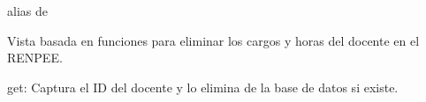 \documentclass[letterpaper,10pt,spanish]{sphinxmanual}
\begin{document}
\begin{fulllineitems}
\begin{fulllineitems}
\end{fulllineitems}



\begin{fulllineitems}

\pysigstartsignatures
{}
\pysigstopsignatures
\sphinxAtStartPar
alias de 

\end{fulllineitems}



\begin{fulllineitems}

\pysigstartsignatures
{}
\pysigstopsignatures
\end{fulllineitems}



\begin{fulllineitems}

\pysigstartsignatures
{}
\pysigstopsignatures
\end{fulllineitems}


\end{fulllineitems}



\begin{fulllineitems}

\pysigstartsignatures
{}
\pysigstopsignatures
\sphinxAtStartPar
Vista basada en funciones para eliminar los cargos y horas del docente en el RENPEE.
\begin{description}
\sphinxAtStartPar
get: Captura el ID del docente y lo elimina de la base de datos si existe.

\end{description}


\begin{fulllineitems}

\pysigstartsignatures
{}
\pysigstopsignatures
\end{fulllineitems}


\end{fulllineitems}
\end{document}
